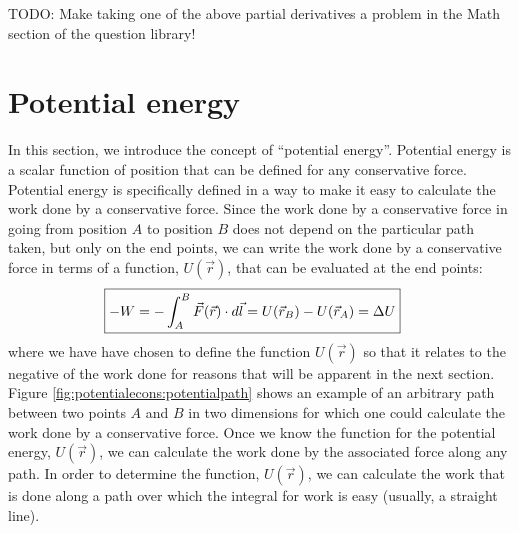 TODO: Make taking one of the above partial derivatives a problem in the Math section of the question library!

\section{Potential energy}
In this section, we introduce the concept of ``potential energy''. Potential energy is a scalar function of position that can be defined for any conservative force. Potential energy is specifically defined in a way to make it easy to calculate the work done by a conservative force. Since the work done by a conservative force in going from position $A$ to position $B$ does not depend on the particular path taken, but only on the end points, we can write the work done by a conservative force in terms of a function, $U(\vec r)$, that can be evaluated at the end points:
\begin{align}
\Aboxed{-W = - \int_A^B \vec F(\vec r) \cdot d\vec l = U(\vec r_B) - U(\vec r_A) = \Delta U}
\end{align}
where we have have chosen to define the function $U(\vec r)$ so that it relates to the negative of the work done for reasons that will be apparent in the next section. Figure \ref{fig:potentialecons:potentialpath} shows an example of an arbitrary path between two points $A$ and $B$ in two dimensions for which one could calculate the work done by a conservative force.
Once we know the function for the potential energy, $U(\vec r)$, we can calculate the work done by the associated force along any path. In order to determine the function, $U(\vec r)$, we can calculate the work that is done along a path over which the integral for work is easy (usually, a straight line). 


